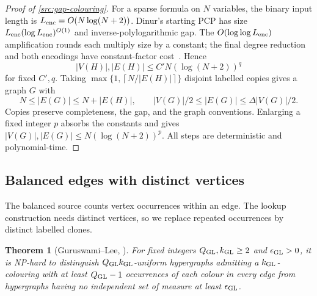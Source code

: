 \documentclass[11pt]{article} \usepackage[utf8]{inputenc}
\theoremstyle{plain} \newtheorem{theorem}{Theorem}[section]
\theoremstyle{definition} \newaliascnt{definition}{theorem}
\newcommand{\ceil}[1]{\left\lceil#1\right\rceil}
\begin{document}
\begin{proof}[Proof of \cref{src:gap-colouring}]
For a sparse formula on $N$ variables, the binary input length is
$L_{\rm enc}=O(N\log(N+2))$. Dinur's starting PCP has size
$L_{\rm enc}(\log L_{\rm enc})^{O(1)}$ and inverse-polylogarithmic gap.
The $O(\log\log L_{\rm enc})$ amplification rounds each multiply size by a
constant; the final degree reduction and both encodings have constant-factor
cost~\cite[Theorem~8.1 and its proof; Lemma~1.7]{dinur2007pcp}. Hence
\[
|V(H)|,|E(H)|\le C' N(\log(N+2))^q
\]
for fixed $C',q$. Taking
$\max\{1,\ceil{N/|E(H)|}\}$ disjoint labelled copies gives a graph $G$ with
\[
N\le |E(G)|\le N+|E(H)|,\qquad
|V(G)|/2\le |E(G)|\le\Delta|V(G)|/2.
\]
Copies preserve completeness, the gap, and the graph conventions. Enlarging a
fixed integer $p$ absorbs the constants and gives
$|V(G)|,|E(G)|\le N(\log(N+2))^p$. All steps are deterministic and
polynomial-time.
\end{proof}

\subsection{Balanced edges with distinct vertices}

The balanced source counts vertex occurrences within an edge. The lookup
construction needs distinct vertices, so we replace repeated occurrences by
distinct labelled clones.

\begin{theorem}[Guruswami--Lee, {\cite[Theorem~1.1]{guruswami2018balanced}}]
\label{yao:gl}
For fixed integers $Q_{\rm GL},k_{\rm GL}\ge2$ and $\epsilon_{\rm GL}>0$, it is
NP-hard to distinguish $Q_{\rm GL}k_{\rm GL}$-uniform hypergraphs admitting a
$k_{\rm GL}$-colouring with at least $Q_{\rm GL}-1$ occurrences of each colour
in every edge from hypergraphs having no independent set of measure at least
$\epsilon_{\rm GL}$.
\end{theorem}
\end{document}
